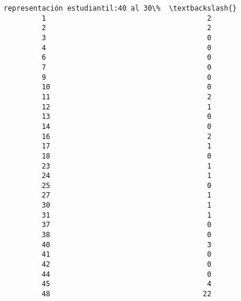 \documentclass[11pt]{article}
\begin{document}
\begin{Verbatim}[commandchars=\\\{\}]
             representación estudiantil:40 al 30\%  \textbackslash{}
         1                                      2   
         2                                      2   
         3                                      0   
         4                                      0   
         6                                      0   
         7                                      0   
         9                                      0   
         10                                     0   
         11                                     2   
         12                                     1   
         13                                     0   
         14                                     0   
         16                                     2   
         17                                     1   
         18                                     0   
         23                                     1   
         24                                     1   
         25                                     0   
         27                                     1   
         30                                     1   
         31                                     1   
         37                                     0   
         38                                     0   
         40                                     3   
         41                                     0   
         42                                     0   
         44                                     0   
         45                                     4   
         48                                    22   
         

\end{Verbatim}
\end{document}
